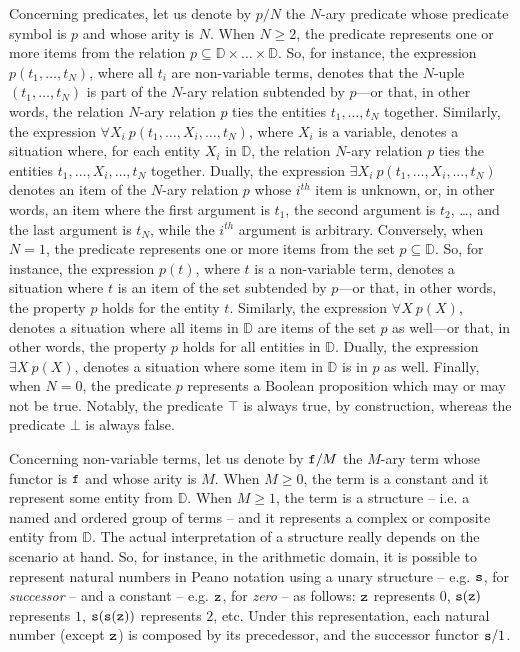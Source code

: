 \documentclass[12pt,a4paper,openright,twoside]{book}
\begin{document}
Concerning predicates, let us denote by $p/N$ the $N$-ary predicate whose predicate symbol is $p$ and whose arity is $N$.
%
%
When $N \geq 2$, the predicate represents one or more items from the relation $p \subseteq \mathbb{D} \times \ldots \times \mathbb{D}$.
%
So, for instance, the expression $p(t_1, \ldots, t_N)$, where all $t_i$ are non-variable terms, denotes that the $N$-uple $(t_1, \ldots, t_N)$ is part of the $N$-ary relation subtended by $p$---or that, in other words, the relation $N$-ary relation $p$ ties the entities $t_1, \ldots, t_N$ together.
%
Similarly, the expression $\forall X_i\ p(t_1, \ldots, X_i, \ldots, t_N)$, where $X_i$ is a variable, denotes a situation where, for each entity $X_i$ in $\mathbb{D}$, the relation $N$-ary relation $p$ ties the entities $t_1, \ldots, X_i, \ldots, t_N$ together.
%
Dually, the expression $\exists X_i\ p(t_1, \ldots, X_i, \ldots, t_N)$ denotes an item of the $N$-ary relation $p$ whose $i^{th}$ item is unknown, or, in other words, an item where the first argument is $t_1$, the second argument is $t_2$, \ldots, and the last argument is $t_N$, while the $i^{th}$ argument is arbitrary.
%
Conversely, when $N = 1$, the predicate represents one or more items from the set $p \subseteq \mathbb{D}$.
%
So, for instance, the expression $p(t)$, where $t$ is a non-variable term, denotes a situation where $t$ is an item of the set subtended by $p$---or that, in other words, the property $p$ holds for the entity $t$.
%
Similarly, the expression $\forall X\ p(X)$, denotes a situation where all items in $\mathbb{D}$ are items of the set $p$ as well---or that, in other words, the property $p$ holds for all entities in $\mathbb{D}$.
%
Dually, the expression $\exists X\ p(X)$, denotes a situation where some item in $\mathbb{D}$ is in $p$ as well.
%
Finally, when $N = 0$, the predicate $p$ represents a Boolean proposition which may or may not be true.
%
Notably, the predicate $\top$ is always true, by construction, whereas the predicate $\bot$ is always false.

Concerning non-variable terms, let us denote by $\mathtt{f}/M$ the $M$-ary term whose functor is $\mathtt{f}$ and whose arity is $M$.
%
When $M \geq 0$, the term is a constant and it represent some entity from $\mathbb{D}$.
%
When $M \geq 1$, the term is a structure -- i.e. a named and ordered group of terms -- and it represents a complex or composite entity from $\mathbb{D}$.
%
The actual interpretation of a structure really depends on the scenario at hand.
%
So, for instance, in the arithmetic domain, it is possible to represent natural numbers in Peano notation
using a unary structure -- e.g. $\mathtt{s}$, for \emph{successor} -- and a constant -- e.g. $\mathtt{z}$, for \emph{zero} -- as follows: 
$\mathtt{z}$ represents $0$, 
$\mathtt{s}(\mathtt{z})$ represents $1$, 
$\mathtt{s}(\mathtt{s}(\mathtt{z}))$ represents $2$, etc. 
%
Under this representation, each natural number (except $\mathtt{z}$) is composed by its precedessor, and the successor functor $\mathtt{s}/1$.
\end{document}
